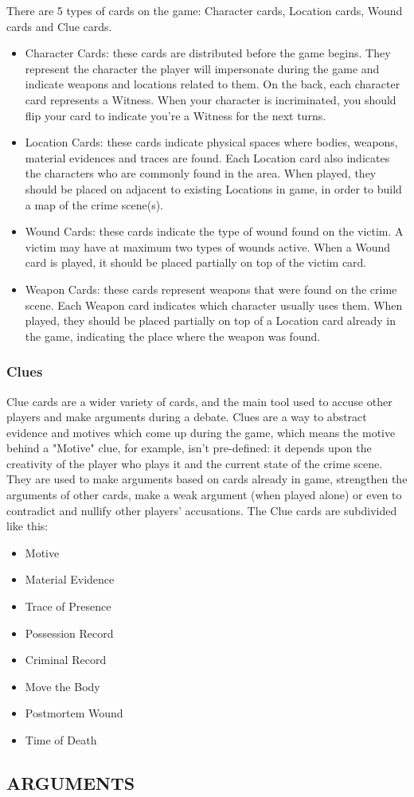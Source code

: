 \documentclass[a4paper, 11pt]{article}
\begin{document}

	There are 5 types of cards on the game: Character cards, Location cards, Wound cards and Clue cards.


	\begin{itemize}
		\item Character Cards: these cards are distributed before the game begins. They represent the character the player will impersonate during the game and indicate weapons and locations related to them. On the back, each character card represents a Witness. When your character is incriminated, you should flip your card to indicate you're a Witness for the next turns.

		\item Location Cards: these cards indicate physical spaces where bodies, weapons, material evidences and traces are found. Each Location card also indicates the characters who are commonly found in the area. When played, they should be placed on adjacent to existing Locations in game, in order to build a map of the crime scene(s).

		\item Wound Cards: these cards indicate the type of wound found on the victim. A victim may have at maximum two types of wounds active. When a Wound card is played, it should be placed partially on top of the victim card.

		\item Weapon Cards: these cards represent weapons that were found on the crime scene. Each Weapon card indicates which character usually uses them. When played, they should be placed partially on top of a Location card already in the game, indicating the place where the weapon was found.
	\end{itemize}

	\subsubsection*{Clues}

		Clue cards are a wider variety of cards, and the main tool used to accuse other players and make arguments during a debate. Clues are a way to abstract evidence and motives which come up during the game, which means the motive behind a "Motive" clue, for example, isn't pre-defined: it depends upon the creativity of the player who plays it and the current state of the crime scene. They are used to make arguments based on cards already in game, strengthen the arguments of other cards, make a weak argument (when played alone) or even to contradict and nullify other players' accusations. The Clue cards are subdivided like this:

		\begin{itemize}
			\item Motive
			\item Material Evidence
			\item Trace of Presence
			\item Possession Record
			\item Criminal Record
			\item Move the Body
			\item Postmortem Wound
			\item Time of Death
		\end{itemize}

\subsection*{ARGUMENTS}
\end{document}
